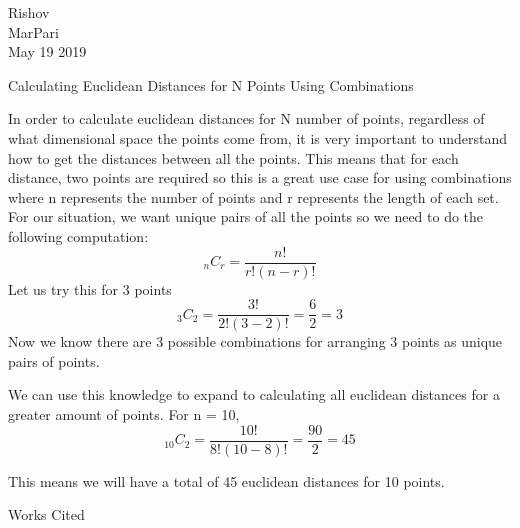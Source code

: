 \documentclass[12pt]{article}
\newenvironment{workscited}{\newpage \begin{center} Works Cited \end{center}}{\newpage }
\begin{document}
\begin{flushleft}

Rishov\\
MarPari\\
May 19 2019\\


\begin{center}
Calculating Euclidean Distances for N Points Using Combinations
\end{center}


\setlength{\parindent}{0.5in}
In order to calculate euclidean distances for N number of points, regardless of what  dimensional space the points come from, it is very important to understand how to get the distances between all the points. This means that for each distance, two points are required so this is a great use case for using combinations where n represents the number of points and r represents the length of each set. For our situation, we want unique pairs of all the points so we need to do the following computation:
$$ _nC_r = \frac{n!}{r!(n-r)!} $$
Let us try this for 3 points
$$ _3C_2 = \frac{3!}{2!(3-2)!} = \frac{6}{2} = 3 $$
Now we know there are 3 possible combinations for arranging 3 points as unique pairs of points.

We can use this knowledge to expand to calculating all euclidean distances for a greater amount of points.
For n = 10,
$$ _{10}C_2 = \frac{10!}{8!(10-8)!} = \frac{90}{2} = 45 $$

This means we will have a total of 45 euclidean distances for 10 points.



\setlength{\parindent}{0.5in}


\begin{workscited}



\end{workscited}

\end{flushleft}
\end{document}
